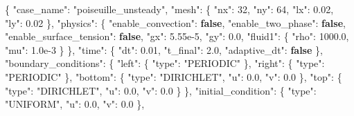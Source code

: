 \documentclass[
  french,
]{article}
\newenvironment{Shaded}{}{}
\newcommand{\DataTypeTok}[1]{\textcolor[rgb]{0.56,0.13,0.00}{#1}}
\newcommand{\DecValTok}[1]{\textcolor[rgb]{0.25,0.63,0.44}{#1}}
\newcommand{\FloatTok}[1]{\textcolor[rgb]{0.25,0.63,0.44}{#1}}
\newcommand{\FunctionTok}[1]{\textcolor[rgb]{0.02,0.16,0.49}{#1}}
\newcommand{\KeywordTok}[1]{\textcolor[rgb]{0.00,0.44,0.13}{\textbf{#1}}}
\newcommand{\StringTok}[1]{\textcolor[rgb]{0.25,0.44,0.63}{#1}}
\begin{document}
\begin{Shaded}
\begin{Highlighting}[]
\FunctionTok{\{}
  \DataTypeTok{"case\_name"}\FunctionTok{:} \StringTok{"poiseuille\_unsteady"}\FunctionTok{,}
  \DataTypeTok{"mesh"}\FunctionTok{:} \FunctionTok{\{} \DataTypeTok{"nx"}\FunctionTok{:} \DecValTok{32}\FunctionTok{,} \DataTypeTok{"ny"}\FunctionTok{:} \DecValTok{64}\FunctionTok{,} \DataTypeTok{"lx"}\FunctionTok{:} \FloatTok{0.02}\FunctionTok{,} \DataTypeTok{"ly"}\FunctionTok{:} \FloatTok{0.02} \FunctionTok{\},}
  \DataTypeTok{"physics"}\FunctionTok{:} \FunctionTok{\{}
    \DataTypeTok{"enable\_convection"}\FunctionTok{:} \KeywordTok{false}\FunctionTok{,}
    \DataTypeTok{"enable\_two\_phase"}\FunctionTok{:} \KeywordTok{false}\FunctionTok{,}
    \DataTypeTok{"enable\_surface\_tension"}\FunctionTok{:} \KeywordTok{false}\FunctionTok{,}
    \DataTypeTok{"gx"}\FunctionTok{:} \FloatTok{5.55e{-}5}\FunctionTok{,} \DataTypeTok{"gy"}\FunctionTok{:} \FloatTok{0.0}\FunctionTok{,}
    \DataTypeTok{"fluid1"}\FunctionTok{:} \FunctionTok{\{} \DataTypeTok{"rho"}\FunctionTok{:} \FloatTok{1000.0}\FunctionTok{,} \DataTypeTok{"mu"}\FunctionTok{:} \FloatTok{1.0e{-}3} \FunctionTok{\}}
  \FunctionTok{\},}
  \DataTypeTok{"time"}\FunctionTok{:} \FunctionTok{\{} \DataTypeTok{"dt"}\FunctionTok{:} \FloatTok{0.01}\FunctionTok{,} \DataTypeTok{"t\_final"}\FunctionTok{:} \FloatTok{2.0}\FunctionTok{,} \DataTypeTok{"adaptive\_dt"}\FunctionTok{:} \KeywordTok{false} \FunctionTok{\},}
  \DataTypeTok{"boundary\_conditions"}\FunctionTok{:} \FunctionTok{\{}
    \DataTypeTok{"left"}\FunctionTok{:}   \FunctionTok{\{} \DataTypeTok{"type"}\FunctionTok{:} \StringTok{"PERIODIC"} \FunctionTok{\},}
    \DataTypeTok{"right"}\FunctionTok{:}  \FunctionTok{\{} \DataTypeTok{"type"}\FunctionTok{:} \StringTok{"PERIODIC"} \FunctionTok{\},}
    \DataTypeTok{"bottom"}\FunctionTok{:} \FunctionTok{\{} \DataTypeTok{"type"}\FunctionTok{:} \StringTok{"DIRICHLET"}\FunctionTok{,} \DataTypeTok{"u"}\FunctionTok{:} \FloatTok{0.0}\FunctionTok{,} \DataTypeTok{"v"}\FunctionTok{:} \FloatTok{0.0} \FunctionTok{\},}
    \DataTypeTok{"top"}\FunctionTok{:}    \FunctionTok{\{} \DataTypeTok{"type"}\FunctionTok{:} \StringTok{"DIRICHLET"}\FunctionTok{,} \DataTypeTok{"u"}\FunctionTok{:} \FloatTok{0.0}\FunctionTok{,} \DataTypeTok{"v"}\FunctionTok{:} \FloatTok{0.0} \FunctionTok{\}}
  \FunctionTok{\},}
  \DataTypeTok{"initial\_condition"}\FunctionTok{:} \FunctionTok{\{} \DataTypeTok{"type"}\FunctionTok{:} \StringTok{"UNIFORM"}\FunctionTok{,} \DataTypeTok{"u"}\FunctionTok{:} \FloatTok{0.0}\FunctionTok{,} \DataTypeTok{"v"}\FunctionTok{:} \FloatTok{0.0} \FunctionTok{\},}

\end{Highlighting}
\end{Shaded}
\end{document}
